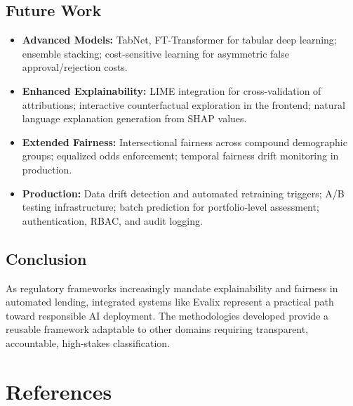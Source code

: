 \documentclass[12pt]{report}
\begin{document}
\section{Future Work}

\begin{itemize}[nosep]
    \item \textbf{Advanced Models:} TabNet, FT-Transformer for tabular deep learning; ensemble stacking; cost-sensitive learning for asymmetric false approval/rejection costs.
    \item \textbf{Enhanced Explainability:} LIME integration for cross-validation of attributions; interactive counterfactual exploration in the frontend; natural language explanation generation from SHAP values.
    \item \textbf{Extended Fairness:} Intersectional fairness across compound demographic groups; equalized odds enforcement; temporal fairness drift monitoring in production.
    \item \textbf{Production:} Data drift detection and automated retraining triggers; A/B testing infrastructure; batch prediction for portfolio-level assessment; authentication, RBAC, and audit logging.
\end{itemize}

\section{Conclusion}

As regulatory frameworks increasingly mandate explainability and fairness in automated lending, integrated systems like Evalix represent a practical path toward responsible AI deployment. The methodologies developed provide a reusable framework adaptable to other domains requiring transparent, accountable, high-stakes classification.



\chapter*{References\hfill} 
\end{document}
